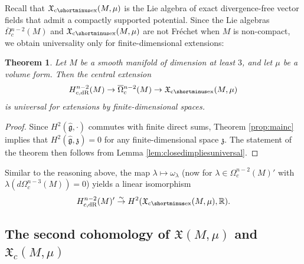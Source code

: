 \documentclass{article}
\newcommand{\dR}{\mathrm{dR}}
\newcommand{\fX}{\mathfrak{X}}
\newcommand{\R}{\mathbb{R}}
\newcommand{\oline}{\overline}
\newcommand{\ceX}{\fX_{\mathrm{c}\shortminus\mathrm{ex}}}
\newtheorem{Theorem}{Theorem}[section]
\theoremstyle{definition}
\begin{document}
Recall that $\ceX(M,\mu)$ is the Lie algebra of exact divergence-free vector fields that admit a compactly supported potential.
Since the Lie algebras $ \oline{\Omega}{}^{n-2}_c(M)$ and $\ceX(M,\mu)$ are not Fréchet when $M$ is non-compact, 
we obtain universality only for finite-dimensional extensions:

\begin{Theorem} Let $M$ be a smooth manifold of dimension at least $3$, and let $\mu$ be a volume form. Then the central extension 
	$$
	H^{n-2}_{c, \dR}(M)\to \oline{\Omega}{}_c^{n-2}(M)\to \ceX(M,\mu)
	$$
	is 
	universal for extensions by finite-dimensional spaces.
\end{Theorem}

\begin{proof}Since $H^2(\hat{\mathfrak g},\cdot)$ commutes with finite direct sums, Theorem \ref{prop:mainc} implies that  $H^2(\hat{\mathfrak g},\mathfrak z)=0$ for any finite-dimensional space $\mathfrak z$. The statement of the theorem then follows from Lemma \ref{lem:closedimpliesuniversal}.
\end{proof}
Similar to the reasoning above, the map $\lambda \mapsto \omega_{\lambda}$ (now for $\lambda \in \Omega^{n-2}_{c}(M)'$ with 
$\lambda(d\Omega_{c}^{n-3}(M))=0$) yields a linear isomorphism 
\begin{equation}
H^{n-2}_{c,\dR}(M)'\stackrel{\sim}{\rightarrow} H^2(\ceX(M,\mu),\R).
\end{equation}

















\subsection{\texorpdfstring{The second cohomology of $\fX(M,\mu)$ and $\fX_c(M,\mu)$}{Second cohomology of divergence-free vector fields}}
\end{document}

